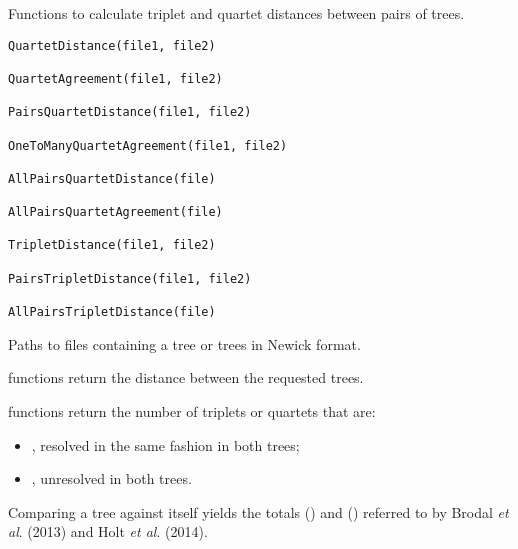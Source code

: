 \documentclass[a4paper]{book}
\begin{document}
%
\begin{Description}\relax
Functions to calculate triplet and quartet distances between pairs of trees.
\end{Description}
%
\begin{Usage}
\begin{verbatim}
QuartetDistance(file1, file2)

QuartetAgreement(file1, file2)

PairsQuartetDistance(file1, file2)

OneToManyQuartetAgreement(file1, file2)

AllPairsQuartetDistance(file)

AllPairsQuartetAgreement(file)

TripletDistance(file1, file2)

PairsTripletDistance(file1, file2)

AllPairsTripletDistance(file)
\end{verbatim}
\end{Usage}
%
\begin{Arguments}
\begin{ldescription}
\item[\code{file, file1, file2}] Paths to files containing a tree or trees in Newick format.
\end{ldescription}
\end{Arguments}
%
\begin{Value}
 functions return the distance between the requested trees.

 functions return the number of triplets or quartets that are:
\begin{itemize}

\item {}, resolved in the same fashion in both trees;
\item {}, unresolved in both trees.

\end{itemize}


Comparing a tree against itself yields the totals () and ()
referred to by Brodal \emph{et al}. (2013) and Holt \emph{et al}. (2014).
\end{Value}
\end{document}
